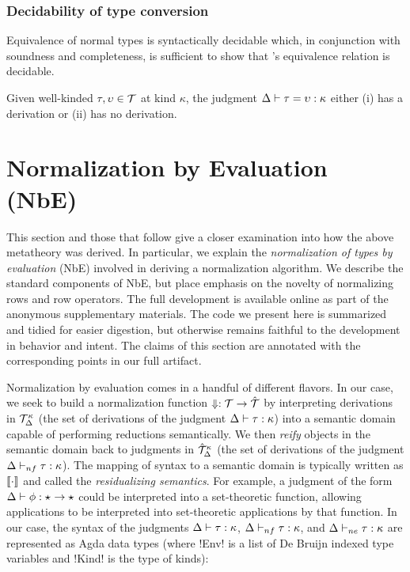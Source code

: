 \documentclass[sigplan,10pt,review]{acmart}\settopmatter{printfolios=true,printccs=false,printacmref=false}
\begin{document}
\subsubsection{Decidability of type conversion}

Equivalence of normal types is syntactically decidable which, in conjunction with soundness and completeness, is sufficient to show that \Rome's equivalence relation is decidable.

\begin{theorem}[Decidability]
  Given well-kinded $\tau, \upsilon \in {\mathcal T}$ at kind $\kappa$, the judgment $\Delta \vdash \tau = \upsilon : \kappa$ either (i) has a derivation or (ii) has no derivation.
\end{theorem}

\section{Normalization by Evaluation (NbE)}
This section and those that follow give a closer examination into how the above metatheory was derived. In particular, we explain the \emph{normalization of types by evaluation} (NbE) involved in deriving a normalization algorithm. We describe the standard components of NbE, but place emphasis on the novelty of normalizing rows and row operators. The full development is available online as part of the anonymous supplementary materials. The code we present here is summarized and tidied for easier digestion, but otherwise remains faithful to the development in behavior and intent. The claims of this section are annotated with the corresponding points in our full artifact. 

\InlineOn{}
Normalization by evaluation comes in a handful of different flavors. In our case, we seek to build a normalization function $\Downarrow : {\mathcal T} \to \hat{{\mathcal T}}$ by interpreting derivations in ${\mathcal T}_{\Delta}^{\kappa}$ (the set of derivations of the judgment $\Delta \vdash \tau : \kappa$) into a semantic domain capable of performing reductions semantically. We then \emph{reify} objects in the semantic domain back to judgments in $\hat{{\mathcal T}}_{\Delta}^{\kappa}$ (the set of derivations of the judgment $\Delta \vdash_{nf} \tau : \kappa$). The mapping of syntax to a semantic domain is typically written as $\llbracket \cdot \rrbracket$ and called the \emph{residualizing semantics}. For example, a judgment of the form $\Delta \vdash \phi : \star_{} \to \star_{}$ could be interpreted into a set-theoretic function, allowing applications to be interpreted into set-theoretic applications by that function. In our case, the syntax of the judgments $\Delta \vdash \tau : \kappa$, $\Delta \vdash_{nf} \tau : \kappa$, and $\Delta \vdash_{ne} \tau : \kappa$ are represented as Agda data types (where !Env! is a list of De Bruijn indexed type variables and !Kind! is the type of kinds): 
\end{document}
